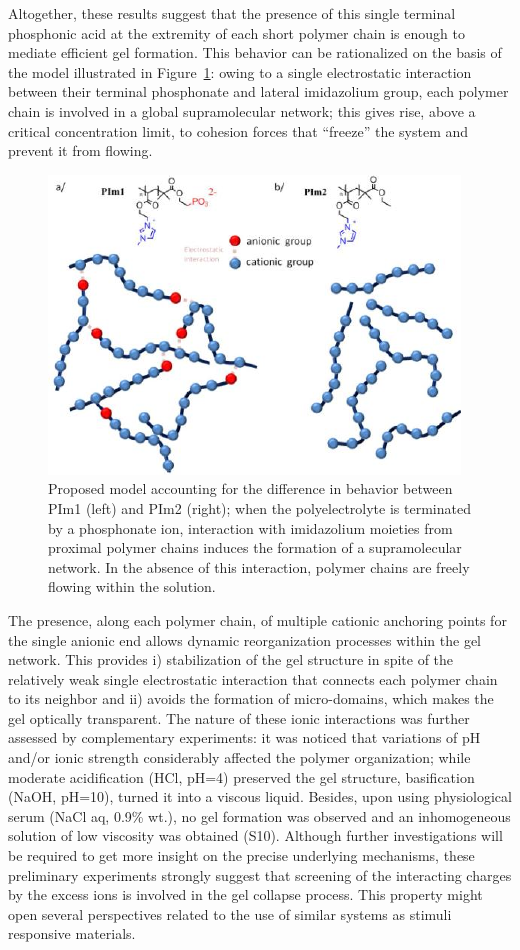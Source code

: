 \documentclass[prl,a4paper,twocolumn,superscriptaddress,showkeys]{revtex4}
\begin{document}
Altogether, these results suggest that the presence of this single terminal phosphonic acid at the extremity of each short polymer chain is enough to mediate efficient gel formation. This behavior can be rationalized on the basis of the model illustrated in Figure~\ref{fig:model}: owing to a single electrostatic interaction between their terminal phosphonate and lateral imidazolium group, each polymer chain is involved in a global supramolecular network; this gives rise, above a critical concentration limit, to cohesion forces that ``freeze'' the system and prevent it from flowing. 

\begin{figure}
\includegraphics[]{fig6}
\caption{Proposed model accounting for the difference in behavior between PIm1 (left) and PIm2 (right); when the polyelectrolyte is terminated by a phosphonate ion, interaction with imidazolium moieties from proximal polymer chains induces the formation of a supramolecular network. In the absence of this interaction, polymer chains are freely flowing within the solution.}
\label{fig:model}
\end{figure}

The presence, along each polymer chain, of multiple cationic anchoring points for the single anionic end allows dynamic reorganization processes within the gel network. This provides i) stabilization of the gel structure in spite of the relatively weak single electrostatic interaction that connects each polymer chain to its neighbor and ii) avoids the formation of micro-domains, which makes the gel optically transparent. The nature of these ionic interactions was further assessed by complementary experiments: it was noticed that variations of pH and/or ionic strength considerably affected the polymer organization; while moderate acidification (HCl, pH=4) preserved the gel structure, basification (NaOH, pH=10), turned it into a viscous liquid. Besides, upon using physiological serum (NaCl aq, 0.9\% wt.), no gel formation was observed and an inhomogeneous solution of low viscosity was obtained (S10). Although further investigations will be required to get more insight on the precise underlying mechanisms, these preliminary experiments strongly suggest that screening of the interacting charges by the excess ions is involved in the gel collapse process. This property might open several perspectives related to the use of similar systems as stimuli responsive materials.
\end{document}
